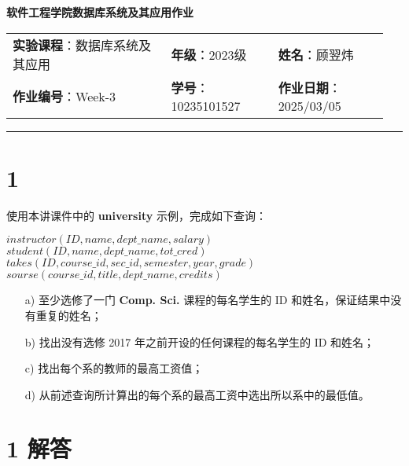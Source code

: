 \documentclass{article}
\begin{document}
	
	\begin{center}
		{\Large{\textbf{\heiti 软件工程学院数据库系统及其应用作业}}}
		\begin{table}[htb]
			\flushleft
			\begin{tabular}{p{0.4\linewidth}p{0.27\linewidth}p{0.28\linewidth}}\\
				\textbf{实验课程}：数据库系统及其应用  & \textbf{年级}：2023级       & \textbf{姓名}：顾翌炜  \\
				\textbf{作业编号}：Week-3    & \textbf{学号}：10235101527 & \textbf{作业日期}：2025/03/05  \\
			\end{tabular}
		\end{table}
	\end{center}
	\rule{\textwidth}{2pt}
	
	\setlength{\parindent}{2em}
	
	\section*{1}
	
	使用本讲课件中的 \textbf{university} 示例，完成如下查询：
	
	\begin{tcolorbox}[title = {课件中的university}, colback = blue!25!white, colframe = blue!75!black]
		$instructor(ID, name, dept\_name, salary)$ \\
		$student(ID, name, dept\_name, tot\_cred)$ \\
		$takes(ID, course\_id, sec\_id, semester, year, grade)$ \\
		$sourse(course\_id, title, dept\_name, credits)$
	\end{tcolorbox}
	
	\begin{enumerate}
		\item[a)] 至少选修了一门 \textbf{Comp. Sci.} 课程的每名学生的 ID 和姓名，保证结果中没有重复的姓名；
		
		\item[b)] 找出没有选修 2017 年之前开设的任何课程的每名学生的 ID 和姓名；
		
		\item[c)] 找出每个系的教师的最高工资值；
		
		\item[d)] 从前述查询所计算出的每个系的最高工资中选出所以系中的最低值。
	\end{enumerate}
	
	\section*{1 解答}
	
\end{document}
